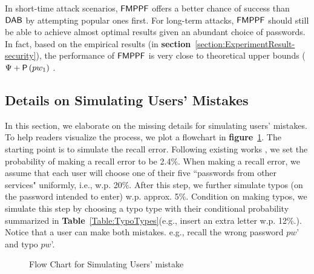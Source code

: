 In short-time attack scenarios, $\mathsf{FMPPF}$ offers a better chance of success than $\mathsf{DAB}$ by attempting popular ones first. For long-term attacks, $\mathsf{FMPPF}$ should still be able to achieve almost optimal results given an abundant choice of passwords.  In fact, based on the empirical results (in \textbf{section}~\ref{section:ExperimentResult-security}), the performance of $\mathsf{FMPPF}$ is very close to theoretical upper bounds ($\Psi + \mathsf{P}\left(pw_1\right)$ . %




\subsection{Details on Simulating Users' Mistakes}\label{appendix:simulateMistakes}
In this section, we elaborate on the missing details for simulating users' mistakes. To help readers visualize the process, we plot a flowchart in \textbf{figure}~\ref{figure:flowChartTypo}. The starting point is to simulate the recall error. Following existing works \cite{CCS:CWPCR17,SP:CAAJR16}, we set the probability of making a recall error to be 2.4\%. When making a recall error, we assume that each user will choose one of their five ``passwords from other services" uniformly, i.e., w.p. 20\%. After this step, we further simulate typos (on the password intended to enter) w.p. approx. 5\%. Condition on making typos, we simulate this step by choosing a typo type with their conditional probability summarized in \textbf{Table}~\ref{Table:TypoTypes}(e.g., insert an extra letter w.p. 12\%.). Notice that a user can make both mistakes. e.g., recall the wrong password $pw$' and typo $pw$'.

\begin{figure}
	
	\caption{Flow Chart for Simulating Users' mistake}\label{figure:flowChartTypo}
\end{figure}


